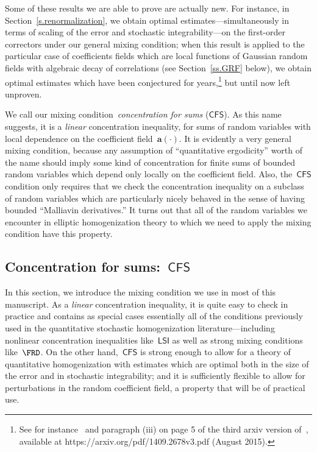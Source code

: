 \documentclass[11pt]{article} %
\numberwithin{equation}{section}
\theoremstyle{definition}
\renewcommand{\a}{\mathbf{a}}
\newcommand{\CFS}{\mathsf{CFS}}
\newcommand{\LSI}{\mathsf{LSI}}
\begin{document}
\smallskip

Some of these results we are able to prove are actually new. For instance, in Section~\ref{s.renormalization}, we obtain optimal estimates---simultaneously in terms of scaling of the error and stochastic integrability---on the first-order correctors under our general mixing condition; when this result is applied to the particular case of coefficients fields which are local functions of Gaussian random fields with algebraic decay of correlations (see Section~\ref{ss.GRF} below), 
we obtain optimal estimates which have been conjectured for years,\footnote{See for instance~\cite{GNO3} and paragraph (iii) on page 5 of the third arxiv version of~\cite{GNO2}, available at https://arxiv.org/pdf/1409.2678v3.pdf (August 2015).} but until now left unproven. 

\smallskip

We call our mixing condition~\emph{concentration for sums} ($\CFS$). As this name suggests, it is a \emph{linear} concentration inequality, for sums of random variables with local dependence on the coefficient field~$\a(\cdot)$. It is evidently a very general mixing condition, because any assumption of ``quantitative ergodicity'' worth of the name should imply some kind of concentration for finite sums of bounded random variables which depend only locally on the coefficient field. Also, the~$\CFS$ condition only requires that we check the concentration inequality on a subclass of random variables which are particularly nicely behaved in the sense of having bounded ``Malliavin derivatives.'' It turns out that all of the random variables we encounter in elliptic homogenization theory to which we need to apply the mixing condition have this property. 

\subsection{Concentration for sums:~\texorpdfstring{$\CFS$}{{(CFS)}}}
\label{ss.CFS.intro}

In this section, we introduce the mixing condition we use in most of this manuscript. As a \emph{linear} concentration inequality, it is quite easy to check in practice and contains as special cases essentially all of the conditions previously used in the quantitative stochastic homogenization literature---including nonlinear concentration inequalities like~$\LSI$ as well as strong mixing conditions like~$\FRD$. On the other hand,~$\CFS$ is strong enough to allow for a theory of quantitative homogenization with estimates which are optimal both in the size of the error and in stochastic integrability; and it is sufficiently flexible to allow for perturbations in the random coefficient field, a property that will be of practical use. 
\end{document}
